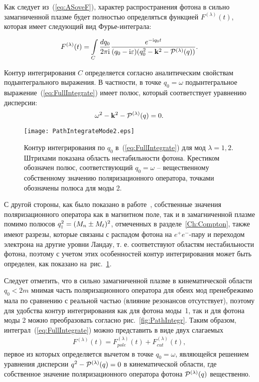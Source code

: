 Как следует из~(\ref{eq:ASoveF}), характер распространения фотона в сильно 
замагниченной плазме будет полностью определяться функцией $F^{(\lambda)} (t)$, 
которая имеет следующий вид Фурье-интеграла:

\begin{equation}\label{eq:FullIntegrate}
	F^{(\lambda)}(t)=\int\limits_{C}\frac{dq_0}{2\pi \ii}\frac{e^{-\ii q_0 
	t}}{(q_0-\ii \varepsilon)(q_0^2-\vec{k}^2-{\cal P}^{(\lambda)}(q))}.
\end{equation}



Контур интегрирования $C$ определяется согласно аналитическим свойствам подынтегрального выражения. В частности, в точке $q_0=\omega$ подынтегральное выражение~(\ref{eq:FullIntegrate}) имеет полюс, который соответствует уравнению дисперсии:
\begin{equation}
	\omega^2 - \vec{k}^2 - {\cal P^{(\lambda)}}(q)=0.
\end{equation}

\begin{center}
	\begin{figure}[t!]\centering
		\texttt{[image: PathIntegrateMode2.eps]}
		\caption{Контур интегрирования по $q_0$ в~(\ref{eq:FullIntegrate}) для мод $\lambda =1,2$. Штрихами показана область нестабильности фотона. Крестиком 
		обозначен полюс, соответствующий $q_0=\omega$ -- вещественному 
		собственному значению поляризационного оператора, точками обозначены 
		полюса для моды 2.} \label{fig:FullPathIntegrMode1}
	\end{figure}
\end{center}

С другой стороны, как было показано в работе~\cite{MikhChist:2001}, собственные значения поляризационного оператора как в магнитном поле, так и в замагниченной плазме помимо полюсов $q_{\mprl}^2=(M_n\pm M_\ell)^2$, отмеченных в разделе~\ref{Ch:Compton}, также имеют разрезы, которые связаны с распадом фотона на $e^+e^-$-пару и переходом электрона на другие уровни Ландау, т. е. соответствуют областям нестабильности фотона, поэтому с учетом этих особенностей  контур интегрирования может быть определен, как показано на~рис.~\ref{fig:FullPathIntegrMode1}.

Следует отметить, что в сильно замагниченной плазме в кинематической области $q_0<2m$ мнимая часть поляризационного оператора для обеих мод пренебрежимо мала по сравнению с реальной частью (влияние резонансов отсутствует), поэтому для удобства контур интегрирования как для фотона моды~1, так и для фотона моды 2 можно преобразовать согласно рис.~\ref{fig:PathIntegr}. Таким образом, интеграл~(\ref{eq:FullIntegrate}) можно представить в виде двух слагаемых
\begin{eqnarray}
F^{(\lambda)}(t) = F^{(\lambda)}_{pole}(t) + F^{(\lambda)}_{cut}(t),
\label{eq:19}
\end{eqnarray}
%
первое из которых определяется вычетом в точке $q_0 = \omega$, являющейся
решением уравнения дисперсии $q^2 - {\cal P}^{(\lambda)}(q) = 0$ в кинематической области, где собственное 
значение поляризационного оператора фотона ${\cal P}^{(\lambda)}(q)$ 
вещественно. 

